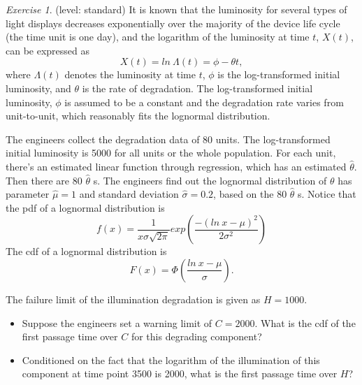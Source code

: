 \documentclass[10pt,a4paper]{article}
\theoremstyle{remark}
\newtheorem{exercise}{Exercise}
\begin{document}
\begin{exercise} 
(level: standard)
It is known that the luminosity for several types of light displays decreases exponentially over the majority of the device life cycle (the time unit is one day), and the logarithm of the luminosity at time $t$, $X(t)$, can be expressed as 
\begin{equation*}
X(t)=ln \ \Lambda(t)=\phi-\theta t,
\end{equation*}
where $\Lambda(t)$ denotes the luminosity at time $t$, $\phi$ is the log-transformed initial luminosity, and $\theta$ is the rate of degradation. The log-transformed initial luminosity, $\phi$ is assumed to be a constant and the degradation rate   varies from unit-to-unit, which reasonably fits the lognormal distribution.

The engineers collect the degradation data of 80 units. The log-transformed initial luminosity is 5000 for all units or the whole population. For each unit, there's an estimated linear function through regression, which has an estimated $\hat{\theta}$. Then there are 80 $\hat{\theta}$ s. The engineers find out the lognormal distribution of $\theta$ has parameter $\hat{\mu}= 1$ and standard deviation $\hat{\sigma}= 0.2$, based on the 80 $\hat{\theta}$ s. Notice that the pdf of a lognormal distribution is
\begin{equation*}
f(x)=\dfrac{1}{x\sigma\sqrt{2\pi}}exp(\dfrac{-(ln \ x -\mu)^{2}}{2\sigma^{2}})
\end{equation*}
The cdf of a lognormal distribution is
\begin{equation*}
F(x)=\Phi(\dfrac{ln \ x -\mu}{\sigma}).
\end{equation*}

The failure limit of the illumination degradation is given as $H=1000$. 
\begin{itemize}
 \item Suppose the engineers set a warning limit of $C=2000$. What is the cdf of the first passage time over $C$ for this degrading component?
 \item Conditioned on the fact that the logarithm of the illumination of this component at time point 3500 is 2000, what is the first passage time over $H$?   
 \end{itemize} 

\end{exercise}
\end{document}
